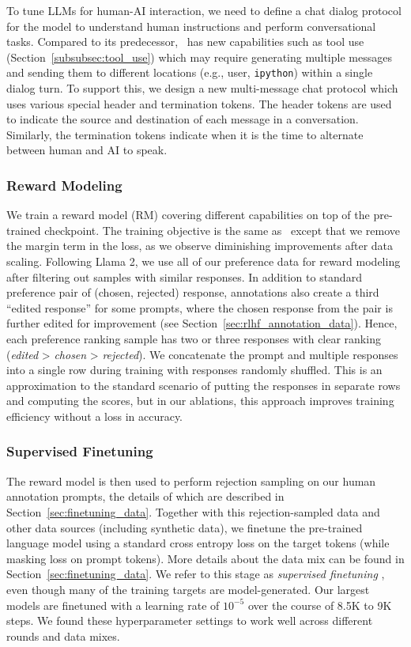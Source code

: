 To tune LLMs for human-AI interaction, we need to define a chat dialog protocol for the model to understand human instructions and perform conversational tasks. Compared to its predecessor, \llamathree~has new capabilities such as tool use (Section~\ref{subsubsec:tool_use}) which may require generating multiple messages and sending them to different locations (e.g., user, \texttt{ipython}) within a single dialog turn. To support this, we design a new multi-message chat protocol which uses various special header and termination tokens. The header tokens are used to indicate the source and destination of each message in a conversation. Similarly, the termination tokens indicate when it is the time to alternate between human and AI to speak. 

\subsubsection{Reward Modeling}
\label{subsubsec:rm}

We train a reward model (RM) covering different capabilities on top of the pre-trained checkpoint. The training objective is the same as \llamatwo~except that we remove the margin term in the loss, as we observe diminishing improvements after data scaling. Following Llama 2, we use all of our preference data for reward modeling after filtering out samples with similar responses. In addition to standard preference pair of (chosen, rejected) response, annotations also create a third ``edited response'' for some prompts, where the chosen response from the pair is further edited for improvement (see Section~\ref{sec:rlhf_annotation_data}). Hence, each preference ranking sample has two or three responses with clear ranking (\emph{edited} > \emph{chosen} > \emph{rejected}). We concatenate the prompt and multiple responses into a single row during training with responses randomly shuffled. This is an approximation to the standard scenario of putting the responses in separate rows and computing the scores, but in our ablations, this approach improves training efficiency without a loss in accuracy. 


\subsubsection{Supervised Finetuning}
\label{subsubsec:sft}
The reward model is then used to perform rejection sampling on our human annotation prompts, the details of which are described in Section~\ref{sec:finetuning_data}. Together with this rejection-sampled data and other data sources (including synthetic data), we finetune the pre-trained language model using a standard cross entropy loss on the target tokens (while masking loss on prompt tokens).
More details about the data mix can be found in Section~\ref{sec:finetuning_data}.
We refer to this stage as \emph{supervised finetuning} \citep[SFT;][]{weifinetuned,sanh2022multitask,wang2022super}, even though many of the training targets are model-generated.
Our largest models are finetuned with a learning rate of $10^{-5}$ over the course of 8.5K to 9K steps. We found these hyperparameter settings to work well across different rounds and data mixes.

